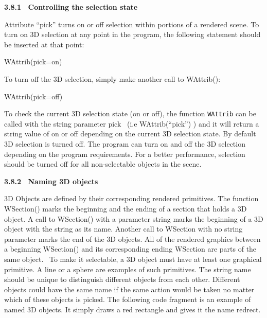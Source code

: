 \documentclass[letterpaper]{article}
\begin{document}
\bigskip

{\bfseries
3.8.1 \ Controlling the selection state}

{
Attribute \textsf{{}``pick''} turns on or off selection within portions of a rendered scene. To turn on 3D selection at
any point in the program, the following statement should be inserted at that point:}


\bigskip

{\sffamily
WAttrib({\textquotedbl}pick=on{\textquotedbl})}


\bigskip

{
To turn off the 3D selection, simply make another call to \textsf{WAttrib()}:}


\bigskip

{\sffamily
WAttrib({\textquotedbl}pick=off{\textquotedbl})}


\bigskip

{
To check the current 3D selection state (on or off), the function \texttt{WAttrib} can be called with the string
parameter \textsf{{\textquotedbl}pick{\textquotedbl}} \ (i.e \textsf{WAttrib(``pick'')} ) and it will return a string
value of \textsf{{\textquotedbl}on{\textquotedbl}} or \textsf{{\textquotedbl}off{\textquotedbl}} depending on the
current 3D selection state. By default 3D selection is turned off. The program can turn on and off the 3D selection
depending on the program requirements. For a better performance, selection should be turned off for all non-selectable
objects in the scene. }


\bigskip

{\bfseries
3.8.2 \ Naming 3D objects}

{
3D Objects are defined by their corresponding rendered primitives. The function \textsf{WSection()} marks the beginning
and the ending of a section that holds a 3D object. A call to \textsf{WSection()} with a parameter string marks the
beginning of a 3D object with the string as its name. Another call to \textsf{WSection} with no string parameter marks
the end of the 3D objects. All of the rendered graphics between a beginning \textsf{WSection()} and its corresponding
ending \textsf{WSection} are parts of the same object. \ To make it selectable, a 3D object must have at least one
graphical primitive. A line or a sphere are examples of such primitives. The string name should be unique to
distinguish different objects from each other. Different objects could have the same name if the same action would be
taken no matter which of these objects is picked. The following code fragment is an example of named 3D objects. It
simply draws a red rectangle and gives it the name {\textquotedbl}redrect{\textquotedbl}.}
\end{document}
